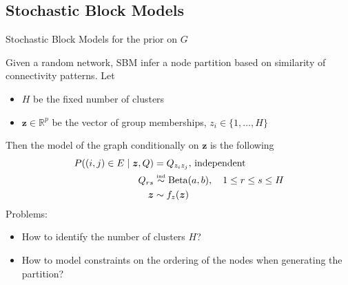 \subsection{Stochastic Block Models}
\begin{frame}{Stochastic Block Models for the prior on $G$}

Given a random network, SBM \alert{infer a node partition} based on similarity of connectivity patterns. Let
\begin{itemize}
    \item $H$ be the fixed number of clusters
    \item $\bm{z} \in \mathbb{R}^p$ be the vector of group memberships, $z_{i} \in \{1,\ldots,H\}$
\end{itemize} 
Then the model of the graph conditionally on $\bm{z}$ is the following
\begin{align*}
    P((i,j)\in E\mid \bm{z},Q) &= Q_{z_{i} z_{j}},\,\text{independent}\\
    Q_{rs} &\overset{\text{\tiny{ind}}}{\sim} \operatorname{Beta}(a,b),\quad 1\leq r\leq s\leq H\\
    \bm{z} &\sim f_{z}(\bm{z})
\end{align*}
Problems:
\begin{itemize}
    \pause
    \item {\small How to \alert{identify the number of clusters $H$}?}
    \pause
    \item {\small How to model \alert{constraints on the ordering of the nodes} when generating the partition?}
\end{itemize}


\end{frame}
















